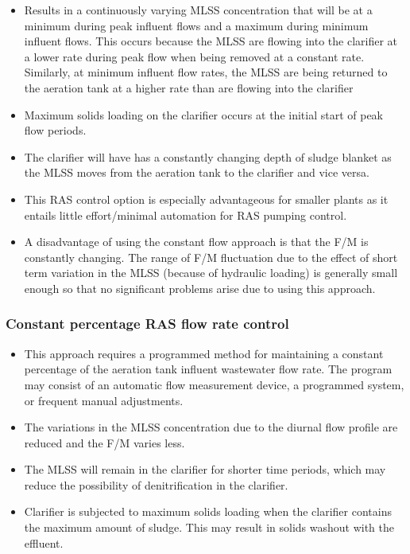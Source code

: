 \begin{itemize}
\item Results in a continuously varying MLSS concentration that will be at a minimum during peak influent flows and a maximum during minimum influent flows. This occurs because the MLSS are flowing into the clarifier at a lower rate during peak flow when being removed at a constant rate. Similarly, at minimum influent flow rates, the MLSS are being returned to the aeration tank at a higher rate than are flowing into the clarifier
\item Maximum solids loading on the clarifier occurs at the initial start of peak flow periods.
\item The clarifier will have has a constantly changing depth of sludge blanket as the MLSS moves from the aeration tank to the clarifier and vice versa. 
\item This RAS control option is especially advantageous for smaller plants as it entails little effort/minimal automation for RAS pumping control.  
\item A disadvantage of using the constant flow approach is that the F/M is constantly changing. The range of F/M fluctuation due to the effect of short term variation in the MLSS (because of hydraulic loading) is generally small enough so that no significant problems arise due to using this approach.
\end{itemize}

		\subsubsection{Constant percentage RAS flow rate control}
\begin{itemize}
\item This approach requires a programmed method for maintaining a constant percentage of the aeration tank influent wastewater flow rate. The program may consist of an automatic flow measurement device, a programmed system, or frequent manual adjustments.
\item The variations in the MLSS concentration due to the diurnal flow profile are reduced and the F/M varies less.
\item The MLSS will remain in the clarifier for shorter time periods, which may reduce the possibility of denitrification in the clarifier.
\item Clarifier is subjected to maximum solids loading when the clarifier contains the maximum amount of sludge. This may result in solids washout with the effluent.\\
\end{itemize}


